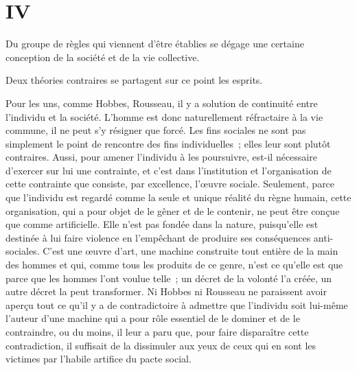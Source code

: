 \documentclass[french,twoside]{book} %
\begin{document}
\section[{IV}]{IV}
\noindent Du groupe de règles qui viennent d’être établies se dégage une certaine conception de la société et de la vie collective.\par
Deux théories contraires se partagent sur ce point les esprits.\par
Pour les uns, comme Hobbes, Rousseau, il y a solution de continuité entre l’individu et la société. L’homme est donc naturellement réfractaire à la vie commune, il ne peut s’y résigner que forcé. Les fins sociales ne sont pas simplement le point de rencontre des fins individuelles ; elles leur sont plutôt contraires. Aussi, pour amener l’individu à les poursuivre, est-il nécessaire d’exercer sur lui une contrainte, et c’est dans l’institution et l’organisation de cette contrainte que consiste, par excellence, l’œuvre sociale. Seulement, parce que l’individu est regardé comme la seule et unique réalité du règne humain, cette organisation, qui a pour objet de le gêner et de le contenir, ne peut être conçue que comme artificielle. Elle n’est pas fondée dans la nature, puisqu’elle est destinée à lui faire violence en l’empêchant de produire ses conséquences anti-sociales. C’est une œuvre d’art, une machine construite tout entière de la main des hommes et qui, comme tous les produits de ce genre, n’est ce qu’elle est que parce que les hommes l’ont voulue telle ; un décret de la volonté l’a créée, un autre décret la peut transformer. Ni Hobbes ni Rousseau ne paraissent avoir aperçu tout ce qu’il y a de contradictoire à admettre que l’individu soit lui-même l’auteur d’une machine qui a pour rôle essentiel de le dominer et de le contraindre, ou du moins, il leur a paru que, pour faire disparaître cette contradiction, il suffisait de la dissimuler aux yeux de ceux qui en sont les victimes par l’habile artifice du pacte social.\par
\end{document}
